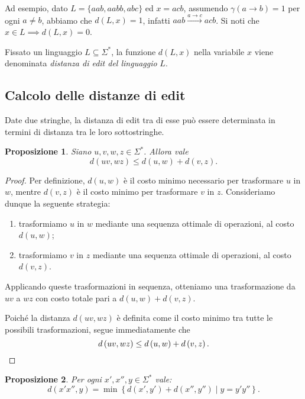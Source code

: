 \documentclass[a4paper,12pt]{report}
\theoremstyle{propositionstyle}
\newtheorem{prop}{Proposizione}[chapter]
\begin{document}
    Ad esempio, dato $L = \{aab, aabb, abc\}$ ed $x = acb$, assumendo $\gamma(a \rightarrow b) = 1$ per ogni $a \neq b$, abbiamo che $d\left(L, x\right) = 1$, infatti $aab \xrightarrow{a \rightarrow c} acb$. Si noti che $x \in L \implies d\left(L, x\right) = 0$.

    Fissato un linguaggio $L \subseteq \Sigma^*$, la funzione $d\left(L, x\right)$ nella variabile $x$ viene denominata \textit{distanza di edit del linguaggio} $L$.

    \subsection{Calcolo delle distanze di edit}

    Date due stringhe, la distanza di edit tra di esse può essere determinata in termini di distanza tra le loro sottostringhe.

\begin{prop}
    Siano $u,v,w,z \in \Sigma^*$. Allora vale
    \[
        d\left(uv, wz\right) \leq d\left(u,w\right) + d\left(v,z\right).
    \]
\end{prop}

\begin{proof}
    Per definizione, $d\left(u,w\right)$ è il costo minimo necessario per trasformare $u$ in $w$, mentre $d\left(v,z\right)$ è il costo minimo per trasformare $v$ in $z$.
    Consideriamo dunque la seguente strategia:
    \begin{enumerate}
        \item trasformiamo $u$ in $w$ mediante una sequenza ottimale di operazioni, al costo $d\left(u,w\right)$;
        \item trasformiamo $v$ in $z$ mediante una sequenza ottimale di operazioni, al costo $d\left(v,z\right)$.
    \end{enumerate}
    Applicando queste trasformazioni in sequenza, otteniamo una trasformazione da $uv$ a $wz$ con costo totale pari a $d\left(u,w\right)+d\left(v,z\right)$.

    Poiché la distanza $d\left(uv,wz\right)$ è definita come il costo minimo tra tutte le possibili trasformazioni, segue immediatamente che
    \[
        d\left(uv, wz\right) \leq d\left(u,w\right) + d\left(v,z\right). \qedhere
    \]
\end{proof}

\begin{prop}
    Per ogni $x', x'', y \in \Sigma^*$ vale:
    \[
        d\left(x'x'', y\right) = \min\left\{d\left(x', y'\right) + d\left(x'', y''\right) \mid y = y'y''\right\}.
    \]
\end{prop}
\end{document}
